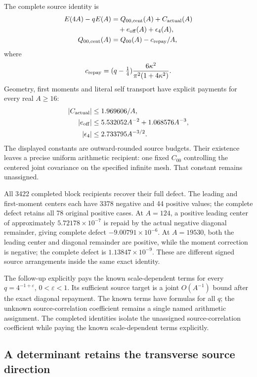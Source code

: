 The complete source identity is
\[
\begin{aligned}
 E(4A)-qE(A)
   &=Q_{00,\rm cent}(A)+C_{\rm actual}(A)\\
   &\quad+e_{\rm off}(A)+\epsilon_4(A),\\
 Q_{00,\rm cent}(A)&=Q_{00}(A)-c_{\rm repay}/A,
\end{aligned}
\]
where
\[
 c_{\rm repay}=(q-\tfrac14)
       \frac{6\kappa^2}{\pi^2(1+4\kappa^2)}.
\]
Geometry, first moments and literal self transport have explicit
payments for every real \(A\geq16\):
\[
\begin{aligned}
 |C_{\rm actual}|&\leq1.969606/A,\\
 |e_{\rm off}|&\leq5.532052A^{-2}
                       +1.068576A^{-3},\\
 |\epsilon_4|&\leq2.733795A^{-3/2}.
\end{aligned}
\]
The displayed constants are outward-rounded source budgets.
Their existence leaves a precise uniform arithmetic recipient:
one fixed \(C_{00}\) controlling the centered joint covariance on the
specified infinite mesh. That constant remains unassigned.

All 3422 completed block recipients recover their full defect.
The leading and first-moment centers each have 3378 negative and 44
positive values; the complete defect retains all 78 original positive
cases. At \(A=124\), a positive leading center of approximately
\(5.72178\times10^{-7}\) is repaid by the actual negative diagonal
remainder, giving complete defect \(-9.00791\times10^{-6}\).
At \(A=19530\), both the leading center and diagonal remainder are
positive, while the moment correction is negative; the complete defect
is \(1.13847\times10^{-9}\). These are different signed source
arrangements inside the same exact identity.

The follow-up explicitly pays the known scale-dependent terms for
every \(q=4^{-1+\varepsilon}\), \(0<\varepsilon<1\). Its sufficient
source target is a joint \(O(A^{-1})\) bound after the exact diagonal
repayment. The known terms have formulas for all \(q\); the unknown
source-correlation coefficient remains a single named arithmetic
assignment. The completed identities isolate the unassigned source-correlation coefficient while paying the known scale-dependent terms explicitly.

\subsection{A determinant retains the transverse source direction}

